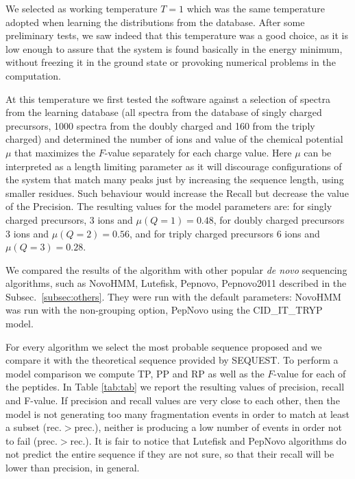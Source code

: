 We selected as working temperature $T=1$ which was the same temperature adopted
when learning the distributions from the database.
After some
preliminary tests, we saw indeed that 
this temperature was  a good choice, as it is low enough to assure that the
system is found basically %
in the energy minimum, without freezing it in the ground state or
provoking numerical problems in the computation. %

At this temperature we first tested the software against a selection of
spectra from the learning database (all spectra from the database of singly
charged precursors, 1000 spectra from the doubly charged and 160 from the triply
charged)
and determined the number of ions and value of the chemical potential $\mu$ that maximizes the $F$-value
separately for each charge value.
Here $\mu$ can be interpreted as a length limiting parameter as it will
discourage configurations of the system that match many peaks just by increasing
the sequence length, using smaller residues.
Such behaviour would increase the
Recall but decrease the value of the Precision.
The resulting values for the model parameters are: for singly charged
precursors, 3 ions and $\mu(Q=1)=0.48$, for doubly charged precursors 3 ions and
$\mu(Q=2)=0.56$, and for triply charged precursors 6 ions and $\mu(Q=3)=0.28$.

We compared the results of the algorithm with other popular \emph{de novo}
sequencing algorithms, such as NovoHMM, Lutefisk, Pepnovo, Pepnovo2011 described
in the Subsec.~\ref{subsec:others}. 
They were run
with the default parameters: NovoHMM was run with the non-grouping option,
PepNovo using the CID\_IT\_TRYP model.

For every algorithm we select the most probable sequence proposed and we compare
it with the theoretical sequence provided by SEQUEST. 
To perform a model comparison we compute TP, PP and RP as well as the $F$-value
for each of the peptides.
In Table \ref{tab:tab} we report the resulting values of precision, recall and
F-value.
If precision and recall values are very close to each other,
 then the model is not generating too many
fragmentation events in order to match at least a subset (rec.$>$prec.),
neither is producing a low number of events in order not to fail
(prec.$>$rec.).
It is fair to notice that Lutefisk and PepNovo algorithms do not predict the
entire sequence if they are not sure, so that their recall
will be lower than precision, in general.



